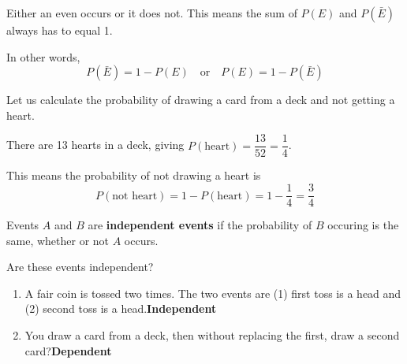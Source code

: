 \documentclass{beamer}
\newcommand{\prob}[1]{P\left(#1\right)}
\begin{document}
\begin{frame}
\begin{note}
Either an even occurs or it does not. This means the sum of $\prob{E}$ and $\prob{\bar{E}}$ always has to equal 1.

\vspace{2mm}
In other words,
\begin{equation*}
\prob{\bar{E}} = 1-\prob{E}
\quad\text{or}\quad
\prob{E} = 1-\prob{\bar{E}}
\end{equation*}
\end{note}\pause

\begin{example}
Let us calculate the probability of drawing a card from a deck and not getting a heart.\pause

\vspace{2mm}
There are 13 hearts in a deck, giving $\prob{\text{heart}}=\dfrac{13}{52}=\dfrac{1}{4}$.\pause

\vspace{2mm}
This means the probability of not drawing a heart is
\begin{equation*}
\prob{\text{not heart}} = 1 - \prob{\text{heart}} = 1-\dfrac{1}{4} = \dfrac{3}{4}
\end{equation*}
\end{example}
\end{frame}

\begin{frame}
\begin{definition}
Events $A$ and $B$ are \textbf{independent events} if the probability of $B$ occuring is the same, whether or not $A$ occurs.
\end{definition}\pause

\begin{example}
Are these events independent?
\begin{enumerate}
\item A fair coin is tossed two times. The two events are (1) first toss is a head and (2) second toss is a head.\pause \quad\textbf{Independent}\pause
\item You draw a card from a deck, then without replacing the first, draw a second card?\pause \quad\textbf{Dependent}
\end{enumerate}
\end{example}
\end{frame}
\end{document}
